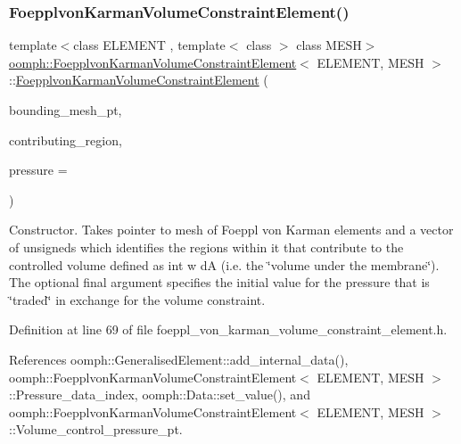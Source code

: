 \subsubsection{\texorpdfstring{Foepplvon\+Karman\+Volume\+Constraint\+Element()}{FoepplvonKarmanVolumeConstraintElement()}\hspace{0.1cm}{\footnotesize\ttfamily [1/2]}}
{\footnotesize\ttfamily template$<$class E\+L\+E\+M\+E\+NT , template$<$ class $>$ class M\+E\+SH$>$ \\
\hyperlink{classoomph_1_1FoepplvonKarmanVolumeConstraintElement}{oomph\+::\+Foepplvon\+Karman\+Volume\+Constraint\+Element}$<$ E\+L\+E\+M\+E\+NT, M\+E\+SH $>$\+::\hyperlink{classoomph_1_1FoepplvonKarmanVolumeConstraintElement}{Foepplvon\+Karman\+Volume\+Constraint\+Element} (\begin{DoxyParamCaption}\item[{M\+E\+SH$<$ E\+L\+E\+M\+E\+NT $>$ $\ast$}]{bounding\+\_\+mesh\+\_\+pt,  }\item[{const \hyperlink{classoomph_1_1Vector}{Vector}$<$ unsigned $>$ \&}]{contributing\+\_\+region,  }\item[{const double \&}]{pressure = {} }\end{DoxyParamCaption})\hspace{0.3cm}{\ttfamily [inline]}}



Constructor. Takes pointer to mesh of Foeppl von Karman elements and a vector of unsigneds which identifies the regions within it that contribute to the controlled volume defined as int w dA (i.\+e. the \char`\"{}volume under the membrane\char`\"{}). The optional final argument specifies the initial value for the pressure that is \char`\"{}traded\char`\"{} in exchange for the volume constraint. 



Definition at line 69 of file foeppl\+\_\+von\+\_\+karman\+\_\+volume\+\_\+constraint\+\_\+element.\+h.



References oomph\+::\+Generalised\+Element\+::add\+\_\+internal\+\_\+data(), oomph\+::\+Foepplvon\+Karman\+Volume\+Constraint\+Element$<$ E\+L\+E\+M\+E\+N\+T, M\+E\+S\+H $>$\+::\+Pressure\+\_\+data\+\_\+index, oomph\+::\+Data\+::set\+\_\+value(), and oomph\+::\+Foepplvon\+Karman\+Volume\+Constraint\+Element$<$ E\+L\+E\+M\+E\+N\+T, M\+E\+S\+H $>$\+::\+Volume\+\_\+control\+\_\+pressure\+\_\+pt.

\mbox{\label{classoomph_1_1FoepplvonKarmanVolumeConstraintElement_a59878334d7186dbbe7fdaa609bb636b9}} 
